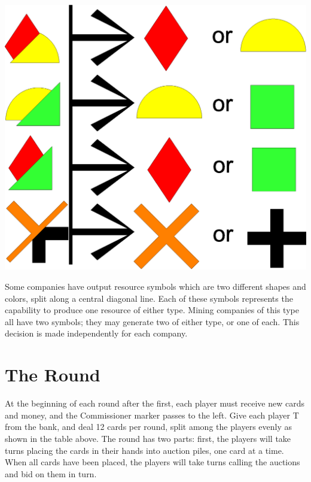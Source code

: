 \documentclass[]{article}
\newcommand{\tyen}{T\textyen}
\begin{document}
\begin{minipage}{.3\textwidth}
\includegraphics[scale=0.2]{hybrids}
\end{minipage}
\begin{minipage}{.7\textwidth}
Some companies have output resource symbols which are two different shapes and
colors, split along a central diagonal line. Each of these symbols represents
the capability to produce one resource of either type. Mining companies of this
type all have two symbols; they may generate two of either type, or one of each.
This decision is made independently for each company.
\end{minipage}



\pagebreak
\section*{The Round}

At the beginning of each round after the first, each player must receive new
cards and money, and the Commissioner marker passes to the left. Give each
player \tyen 10 from the bank, and deal 12 cards per round, split among the
players evenly as shown in the table above. The round has two parts: first, the
players will take turns placing the cards in their hands into auction piles, one
card at a time. When all cards have been placed, the players will take turns
calling the auctions and bid on them in turn.
\end{document}

